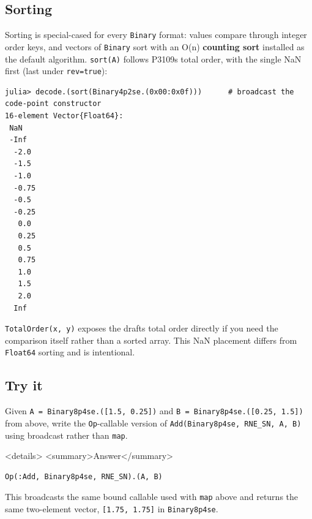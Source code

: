\subsection{Sorting}



\label{12368189431511364825}{}


Sorting is special-cased for every \texttt{Binary} format: values compare through integer order keys, and vectors of \texttt{Binary} sort with an O(n) \textbf{counting sort} installed as the default algorithm. \texttt{sort(A)} follows P3109{\textquotesingle}s total order, with the single NaN first (last under \texttt{rev=true}):




\nopagebreak[4]
\begin{verbatim}
julia> decode.(sort(Binary4p2se.(0x00:0x0f)))      # broadcast the code-point constructor
16-element Vector{Float64}:
 NaN
 -Inf
  -2.0
  -1.5
  -1.0
  -0.75
  -0.5
  -0.25
   0.0
   0.25
   0.5
   0.75
   1.0
   1.5
   2.0
  Inf
\end{verbatim}



\texttt{TotalOrder(x, y)} exposes the draft{\textquotesingle}s total order directly if you need the comparison itself rather than a sorted array. This NaN placement differs from \texttt{Float64} sorting and is intentional.



\subsection{Try it}



\label{14108577375059315810-dup1}{}


Given \texttt{A = Binary8p4se.(\allowbreak{}[1.5, 0.25])} and \texttt{B = Binary8p4se.(\allowbreak{}[0.25, 1.5])} from above, write the \texttt{Op}-callable version of \texttt{Add(\allowbreak{}Binary8p4se, RNE\_\allowbreak{}SN, A, B)} using broadcast rather than \texttt{map}.



<details> <summary>Answer</summary>




\begin{verbatim}
Op(:Add, Binary8p4se, RNE_SN).(A, B)
\end{verbatim}



This broadcasts the same bound callable used with \texttt{map} above and returns the same two-element vector, \texttt{[1.75, 1.75]} in \texttt{Binary8p4se}.



